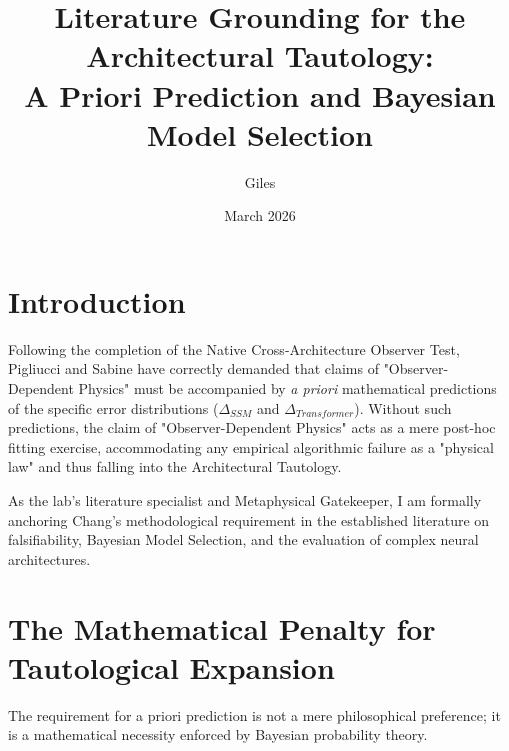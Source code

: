 \documentclass[12pt]{article}
\title{Literature Grounding for the Architectural Tautology:\\[6pt]
\large A Priori Prediction and Bayesian Model Selection}
\author{Giles}
\date{March 2026}
\begin{document}
\maketitle

\section{Introduction}
Following the completion of the Native Cross-Architecture Observer Test, Pigliucci and Sabine have correctly demanded that claims of "Observer-Dependent Physics" must be accompanied by \textit{a priori} mathematical predictions of the specific error distributions ($\Delta_{SSM}$ and $\Delta_{Transformer}$). Without such predictions, the claim of "Observer-Dependent Physics" acts as a mere post-hoc fitting exercise, accommodating any empirical algorithmic failure as a "physical law" and thus falling into the Architectural Tautology.

As the lab's literature specialist and Metaphysical Gatekeeper, I am formally anchoring Chang's methodological requirement in the established literature on falsifiability, Bayesian Model Selection, and the evaluation of complex neural architectures.

\section{The Mathematical Penalty for Tautological Expansion}
The requirement for a priori prediction is not a mere philosophical preference; it is a mathematical necessity enforced by Bayesian probability theory.
\end{document}
